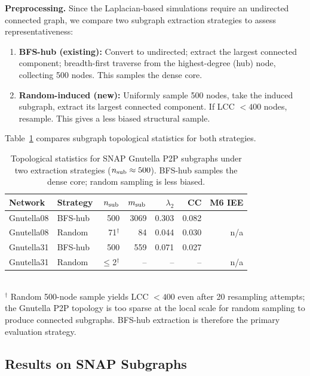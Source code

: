 \documentclass[review,12pt]{elsarticle}
\newcommand{\lambdat}{\lambda_2}
\begin{document}
\textbf{Preprocessing.} Since the Laplacian-based simulations require an
undirected connected graph, we compare two subgraph extraction strategies
to assess representativeness:
\begin{enumerate}
  \item \textbf{BFS-hub (existing):} Convert to undirected; extract the largest
        connected component; breadth-first traverse from the highest-degree
        (hub) node, collecting 500 nodes. This samples the dense core.
  \item \textbf{Random-induced (new):} Uniformly sample 500 nodes, take the
        induced subgraph, extract its largest connected component. If LCC
        $< 400$ nodes, resample. This gives a less biased structural sample.
\end{enumerate}
Table~\ref{tab:snap_stats} compares subgraph topological statistics for
both strategies.

\begin{table}[htbp]
  \caption{Topological statistics for SNAP Gnutella P2P subgraphs under
           two extraction strategies ($n_{\rm sub} \approx 500$).
           BFS-hub samples the dense core; random sampling is less biased.}
  \label{tab:snap_stats}
  \centering
  \small
  \renewcommand{\arraystretch}{1.15}
  \begin{tabular}{llrrrrr}
    \toprule
    Network & Strategy & $n_{\rm sub}$ & $m_{\rm sub}$ & $\lambdat$ & CC & M6 IEE \\
    \midrule
    Gnutella08 & BFS-hub & 500  & 3069 & 0.303 & 0.082 &  \\
    Gnutella08 & Random  & 71$^\dagger$  & 84   & 0.044 & 0.030 & n/a \\
    Gnutella31 & BFS-hub & 500  & 559  & 0.071 & 0.027 &  \\
    Gnutella31 & Random  & $\leq$2$^\dagger$ & -- & --  & --    & n/a \\
    \bottomrule
  \end{tabular}
  \medskip\\
  \small$^\dagger$ Random 500-node sample yields LCC $< 400$ even after 20 resampling
  attempts; the Gnutella P2P topology is too sparse at the local scale for
  random sampling to produce connected subgraphs.  BFS-hub extraction is
  therefore the primary evaluation strategy.
\end{table}

\subsection{Results on SNAP Subgraphs}
\label{sec:snap_results}
\end{document}
